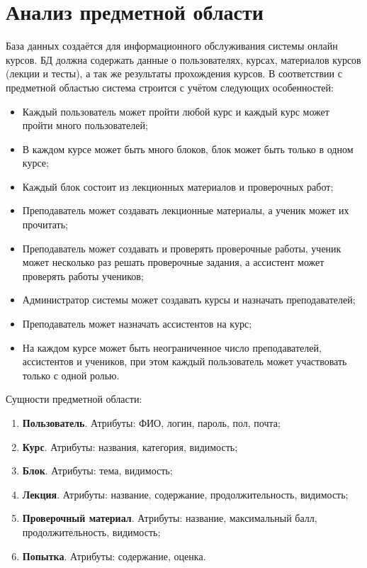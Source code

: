 \documentclass[a4paper,14pt]{article}
\begin{document}

\tableofcontents
\pagebreak

\section{Анализ предметной области}

База данных создаётся для информационного обслуживания системы онлайн курсов.
БД должна содержать данные о пользователях, курсах, материалов курсов (лекции и тесты), а так же результаты прохождения курсов.
В соответствии с предметной областью система строится с учётом следующих особенностей:

\begin{itemize}
	\item Каждый пользователь может пройти любой курс и каждый курс может пройти много пользователей;
	\item В каждом курсе может быть много блоков, блок может быть только в одном курсе;
	\item Каждый блок состоит из лекционных материалов и проверочных работ;
	\item Преподаватель может создавать лекционные материалы, а ученик может их прочитать;
	\item Преподаватель может создавать и проверять проверочные работы, ученик может несколько раз решать проверочные задания, а ассистент может проверять работы учеников;
	\item Администратор системы может создавать курсы и назначать преподавателей;
	\item Преподаватель может назначать ассистентов на курс;
	\item На каждом курсе может быть неограниченное число преподавателей, ассистентов и учеников, при этом каждый пользователь может участвовать только с одной ролью.	
\end{itemize}

Сущности предметной области:

\begin{enumerate}
	\item \textbf{Пользователь}. Атрибуты: ФИО, логин, пароль, пол, почта;
	\item \textbf{Курс}. Атрибуты: названия, категория, видимость;
	\item \textbf{Блок}. Атрибуты: тема, видимость;
	\item \textbf{Лекция}. Атрибуты: название, содержание, продолжительность, видимость;
	\item \textbf{Проверочный материал}. Атрибуты: название, максимальный балл, продолжительность, видимость;
	\item \textbf{Попытка}. Атрибуты: содержание, оценка.
\end{enumerate}
\end{document}
